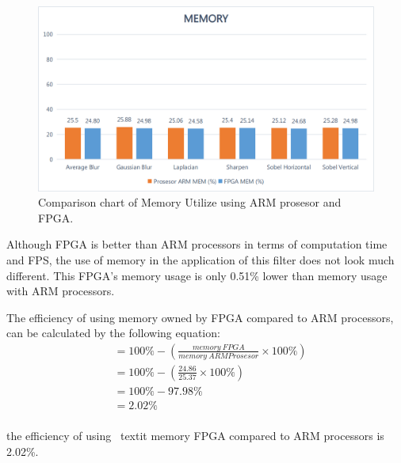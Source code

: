 \begin{figure}[H]
    \includegraphics[width=0.81\linewidth, center]{images/chart/chart-mem.png}
    \caption{Comparison chart of Memory Utilize using ARM prosesor and FPGA.}
    \label{fig:chart-mem}
\end{figure}


Although FPGA is better than ARM processors in terms of computation time and FPS, the use of memory in the application of this filter does not look much different. This FPGA's memory usage is only 0.51\% lower than memory usage with ARM processors.


The efficiency of using memory owned by FPGA compared to ARM processors, can be calculated by the following equation:
\begin{equation*}
    \begin{split}
& = 100\% - \left( \frac{memory\ FPGA}{memory\ ARM Prosesor} \times 100\% \right) \\
& = 100\% - \left( \frac{24.86}{25.37} \times 100\% \right) \\
& = 100\% - 97.98\% \\
& = 2.02\% \\
    \end{split}
\end{equation*}

the efficiency of using \ textit {memory} FPGA compared to ARM processors is 2.02\%.


